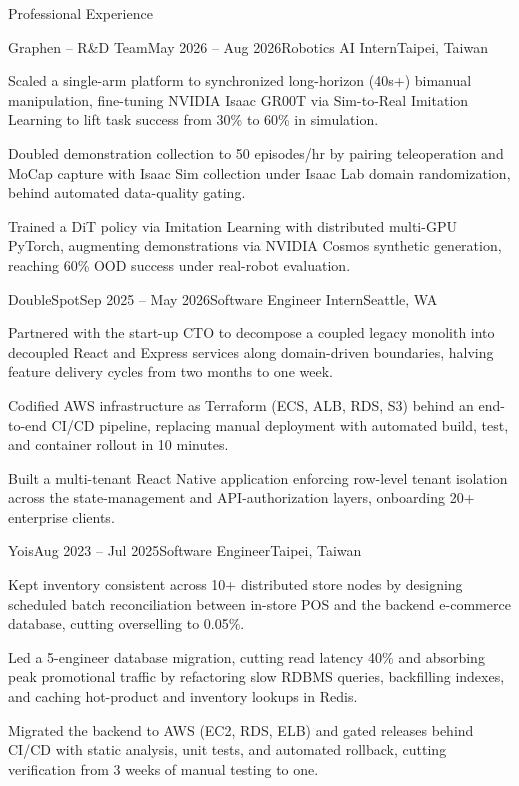 \documentclass{resume}
\begin{document}
\begin{rSection}{Professional Experience}
\begin{rSubsection}{Graphen -- R\&D Team}{May 2026 -- Aug 2026}{Robotics AI Intern}{Taipei, Taiwan}
\item Scaled a single-arm platform to synchronized long-horizon (40s+) bimanual manipulation, fine-tuning NVIDIA Isaac GR00T via Sim-to-Real Imitation Learning to lift task success from 30\% to 60\% in simulation.
\item Doubled demonstration collection to 50 episodes/hr by pairing teleoperation and MoCap capture with Isaac Sim collection under Isaac Lab domain randomization, behind automated data-quality gating.
\item Trained a DiT policy via Imitation Learning with distributed multi-GPU PyTorch, augmenting demonstrations via NVIDIA Cosmos synthetic generation, reaching 60\% OOD success under real-robot evaluation.
\end{rSubsection}
\begin{rSubsection}{DoubleSpot}{Sep 2025 -- May 2026}{Software Engineer Intern}{Seattle, WA}
\item Partnered with the start-up CTO to decompose a coupled legacy monolith into decoupled React and Express services along domain-driven boundaries, halving feature delivery cycles from two months to one week.
\item Codified AWS infrastructure as Terraform (ECS, ALB, RDS, S3) behind an end-to-end CI/CD pipeline, replacing manual deployment with automated build, test, and container rollout in 10 minutes.
\item Built a multi-tenant React Native application enforcing row-level tenant isolation across the state-management and API-authorization layers, onboarding 20+ enterprise clients.
\end{rSubsection}
\begin{rSubsection}{Yois}{Aug 2023 -- Jul 2025}{Software Engineer}{Taipei, Taiwan}
\item Kept inventory consistent across 10+ distributed store nodes by designing scheduled batch reconciliation between in-store POS and the backend e-commerce database, cutting overselling to 0.05\%.
\item Led a 5-engineer database migration, cutting read latency 40\% and absorbing peak promotional traffic by refactoring slow RDBMS queries, backfilling indexes, and caching hot-product and inventory lookups in Redis.
\item Migrated the backend to AWS (EC2, RDS, ELB) and gated releases behind CI/CD with static analysis, unit tests, and automated rollback, cutting verification from 3 weeks of manual testing to one.
\end{rSubsection}
\end{rSection}
\end{document}
